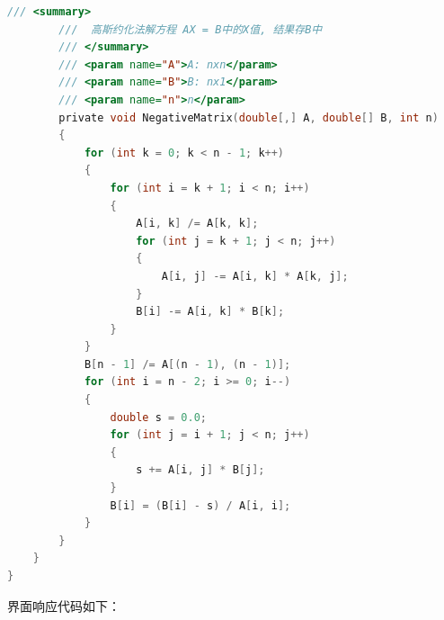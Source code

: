 \begin{lstlisting}[language=C]
        /// <summary>
        ///  高斯约化法解方程 AX = B中的X值, 结果存B中
        /// </summary>
        /// <param name="A">A: nxn</param>
        /// <param name="B">B: nx1</param>
        /// <param name="n">n</param>
        private void NegativeMatrix(double[,] A, double[] B, int n)
        {
            for (int k = 0; k < n - 1; k++)
            {
                for (int i = k + 1; i < n; i++)
                {
                    A[i, k] /= A[k, k];
                    for (int j = k + 1; j < n; j++)
                    {
                        A[i, j] -= A[i, k] * A[k, j];
                    }
                    B[i] -= A[i, k] * B[k];
                }
            }
            B[n - 1] /= A[(n - 1), (n - 1)];
            for (int i = n - 2; i >= 0; i--)
            {
                double s = 0.0;
                for (int j = i + 1; j < n; j++)
                {
                    s += A[i, j] * B[j];
                }
                B[i] = (B[i] - s) / A[i, i];
            }
        }
    }
}
\end{lstlisting}

界面响应代码如下：

